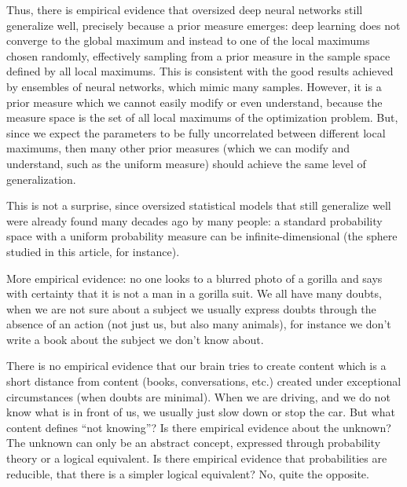 \documentclass[11pt,a4paper]{report}
\begin{document}
Thus, there is empirical evidence that oversized deep neural networks
still generalize well, precisely because a prior measure emerges: deep
learning does not converge to the global maximum and instead to one of
the local maximums chosen randomly, effectively sampling from a prior
measure in the sample space defined by all local maximums. This is
consistent with the good results achieved by ensembles of neural
networks\cite{lakshminarayanan2017simple}\cite{egele2022autodeuq},
which mimic many samples. However, it is a prior measure which we cannot
easily modify or even understand, because the measure space is the set
of all local maximums of the optimization problem. But, since we expect
the parameters to be fully uncorrelated between different local
maximums, then many other prior measures (which we can modify and
understand, such as the uniform measure) should achieve the same level
of generalization.

This is not a surprise, since oversized statistical models that still
generalize well were already found many decades ago by many
people\cite{Peterson2019GaussianLA}: a
standard probability space with a uniform probability measure can be
infinite-dimensional (the
sphere\cite{Peterson2019GaussianLA}
studied in this article, for instance).

More empirical evidence: no one looks to a blurred photo of a gorilla
and says with certainty that it is not a man in a gorilla suit. We all
have many doubts, when we are not sure about a subject we usually
express doubts through the absence of an action (not just us, but also
many animals), for instance we don't write a book about the subject we
don't know about.

There is no empirical evidence that our brain tries to create content
which is a short distance from content (books, conversations, etc.)
created under exceptional circumstances (when doubts are minimal). When
we are driving, and we do not know what is in front of us, we usually
just slow down or stop the car. But what content defines ``not
knowing''? Is there empirical evidence about the unknown? The unknown
can only be an abstract concept, expressed through probability theory or
a logical equivalent. Is there empirical evidence that probabilities are
reducible, that there is a simpler logical equivalent? No, quite the
opposite.
\end{document}
